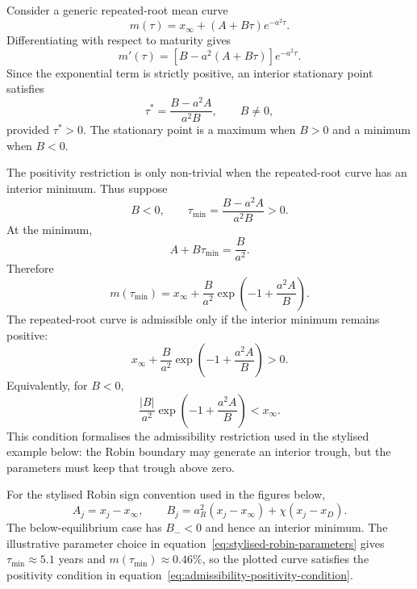\documentclass[11pt]{article}
\numberwithin{equation}{section}
\begin{document}
Consider a generic repeated-root mean curve
\begin{equation}
\label{eq:admissibility-generic-curve}
m(\tau)=x_\infty+(A+B\tau)e^{-a^2\tau}.
\end{equation}
Differentiating with respect to maturity gives
\begin{equation}
\label{eq:admissibility-first-derivative}
m'(\tau)=\left[B-a^2(A+B\tau)\right]e^{-a^2\tau}.
\end{equation}
Since the exponential term is strictly positive, an interior stationary point satisfies
\begin{equation}
\label{eq:admissibility-stationary-point}
\tau^* = \frac{B-a^2A}{a^2B},
\qquad B\neq0,
\end{equation}
provided $\tau^*>0$. The stationary point is a maximum when $B>0$ and a minimum when $B<0$.

The positivity restriction is only non-trivial when the repeated-root curve has an interior minimum. Thus suppose
\begin{equation}
\label{eq:admissibility-minimum-conditions}
B<0,
\qquad
\tau_{\min}=\frac{B-a^2A}{a^2B}>0.
\end{equation}
At the minimum,
\begin{equation}
\label{eq:admissibility-A-plus-Btau}
A+B\tau_{\min}=\frac{B}{a^2}.
\end{equation}
Therefore
\begin{equation}
\label{eq:admissibility-minimum-value}
m(\tau_{\min})
=
x_\infty+\frac{B}{a^2}
\exp\left(-1+\frac{a^2A}{B}\right).
\end{equation}
The repeated-root curve is admissible only if the interior minimum remains positive:
\begin{equation}
\label{eq:admissibility-positivity-condition}
x_\infty+\frac{B}{a^2}
\exp\left(-1+\frac{a^2A}{B}\right)>0.
\end{equation}
Equivalently, for $B<0$,
\begin{equation}
\label{eq:admissibility-positivity-condition-absolute}
\frac{|B|}{a^2}
\exp\left(-1+\frac{a^2A}{B}\right)<x_\infty.
\end{equation}
This condition formalises the admissibility restriction used in the stylised example below: the Robin boundary may generate an interior trough, but the parameters must keep that trough above zero.

For the stylised Robin sign convention used in the figures below,
\begin{equation}
\label{eq:admissibility-robin-A-B}
A_j=x_j-x_\infty,
\qquad
B_j=a_R^2(x_j-x_\infty)+\chi(x_j-x_D).
\end{equation}
The below-equilibrium case has $B_-<0$ and hence an interior minimum. The illustrative parameter choice in equation~\eqref{eq:stylised-robin-parameters} gives $\tau_{\min}\approx5.1$ years and $m(\tau_{\min})\approx0.46\%$, so the plotted curve satisfies the positivity condition in equation~\eqref{eq:admissibility-positivity-condition}.
\end{document}
